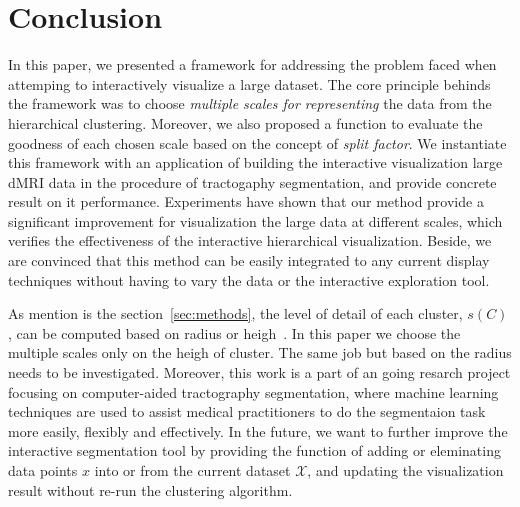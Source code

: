 \section{Conclusion}
\label{sec:conclusion}
In this paper, we presented a framework for addressing the problem faced when attemping to interactively visualize a large dataset. The core principle behinds the framework was to choose \emph{multiple scales for representing} the data from the hierarchical clustering. Moreover, we also proposed a function to evaluate the goodness of each chosen scale based on the concept of \emph{split factor}. We instantiate this framework with an application of building the interactive visualization large dMRI data in the procedure of tractogaphy segmentation, and provide concrete result on it performance. Experiments have shown that our method provide a significant improvement for visualization the large data at different scales, which verifies the effectiveness of the interactive hierarchical visualization. Beside, we are convinced that this method can be easily integrated to any current display techniques without having to vary the data or the interactive exploration tool. 

As mention is the section~\ref{sec:methods}, the level of detail of each cluster, $s(C)$, can be computed based on radius or heigh~\cite{yang2003interactive}. In this paper we choose the multiple scales only on the heigh of cluster. The same job but based on the radius needs to be investigated. Moreover, this work is a part of an going resarch project focusing on computer-aided tractography segmentation, where machine learning techniques are used to assist medical practitioners to do the segmentaion task more easily, flexibly  and effectively. In the future, we want to further improve the interactive segmentation tool by providing the function of adding or eleminating data points $x$ into or from the current dataset $\mathcal{X}$, and updating the visualization result without re-run the clustering algorithm.



